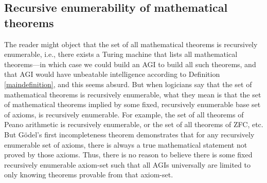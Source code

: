 \documentclass[runningheads]{llncs}
\begin{document}
\subsection{Recursive enumerability of mathematical theorems}

The reader might object that the set of all mathematical theorems is recursively enumerable,
i.e., there exists a Turing machine that lists all mathematical theorems---in which case we
could build an AGI to build all such theorems, and that AGI would have unbeatable intelligence
according to Definition \ref{maindefinition}, and this seems absurd.
But when logicians say that the set of mathematical theorems is recursively enumerable,
what they mean is that the set of mathematical theorems implied by some fixed, recursively
enumerable base set of axioms, is recursively enumerable. For example, the set of all
theorems of Peano arithmetic is recursively enumerable, or the set of all theorems of
ZFC, etc. But G\"odel's first incompleteness theorem demonstrates that for any recursively
enumerable set of axioms, there is always a true mathematical statement not proved by
those axioms. Thus, there is no reason to believe there is some fixed recursively enumerable
axiom-set such that all AGIs universally are limited to only knowing theorems provable
from that axiom-set.



\end{document}
